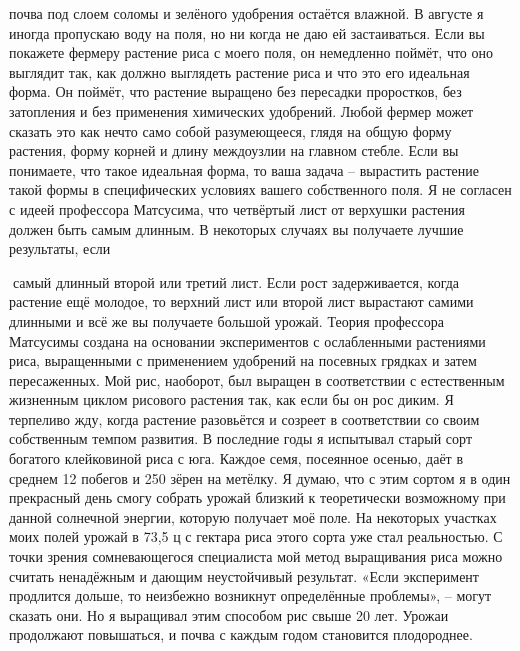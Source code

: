 \documentclass[a4paper]{book}
\begin{document}
почва под слоем соломы и зелёного удобрения остаётся влажной. В августе я иногда
пропускаю воду на поля, но ни когда не даю ей застаиваться.
Если вы покажете фермеру растение риса с моего поля, он немедленно поймёт, что оно
выглядит так, как должно выглядеть растение риса и что это его идеальная форма. Он
поймёт, что растение выращено без пересадки проростков, без затопления и без применения
химических удобрений. Любой фермер может сказать это как нечто само собой
разумеющееся, глядя на общую форму растения, форму корней и длину междоузлии на
главном стебле. Если вы понимаете, что такое идеальная форма, то ваша задача – вырастить
растение такой формы в специфических условиях вашего собственного поля.
Я не согласен с идеей профессора Матсусима, что четвёртый лист от верхушки растения
должен быть самым длинным. В некоторых случаях вы получаете лучшие результаты, если

самый длинный второй или третий лист. Если рост задерживается, когда растение ещё
молодое, то верхний лист или второй лист вырастают самими длинными и всё же вы
получаете большой урожай.
Теория профессора Матсусимы создана на основании экспериментов с ослабленными
растениями риса, выращенными с применением удобрений на посевных грядках и затем
пересаженных. Мой рис, наоборот, был выращен в соответствии с естественным жизненным
циклом рисового растения так, как если бы он рос диким. Я терпеливо жду, когда растение
разовьётся и созреет в соответствии со своим собственным темпом развития.
В последние годы я испытывал старый сорт богатого клейковиной риса с юга. Каждое
семя, посеянное осенью, даёт в среднем 12 побегов и 250 зёрен на метёлку. Я думаю, что с
этим сортом я в один прекрасный день смогу собрать урожай близкий к теоретически
возможному при данной солнечной энергии, которую получает моё поле. На некоторых
участках моих полей урожай в 73,5 ц с гектара риса этого сорта уже стал реальностью.
С точки зрения сомневающегося специалиста мой метод выращивания риса можно
считать ненадёжным и дающим неустойчивый результат. «Если эксперимент продлится
дольше, то неизбежно возникнут определённые проблемы», – могут сказать они. Но я
выращивал этим способом рис свыше 20 лет. Урожаи продолжают повышаться, и почва с
каждым годом становится плодороднее.
\end{document}
